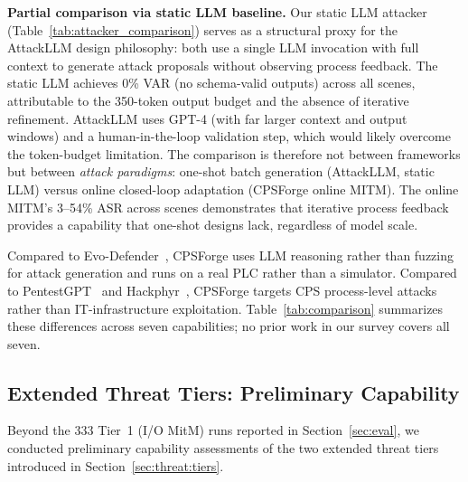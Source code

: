 \textbf{Partial comparison via static LLM baseline.} Our static LLM attacker (Table~\ref{tab:attacker_comparison}) serves as a structural proxy for the AttackLLM design philosophy: both use a single LLM invocation with full context to generate attack proposals without observing process feedback. The static LLM achieves 0\% VAR (no schema-valid outputs) across all scenes, attributable to the 350-token output budget and the absence of iterative refinement. AttackLLM uses GPT-4 (with far larger context and output windows) and a human-in-the-loop validation step, which would likely overcome the token-budget limitation. The comparison is therefore not between frameworks but between \emph{attack paradigms}: one-shot batch generation (AttackLLM, static LLM) versus online closed-loop adaptation (CPSForge online MITM). The online MITM's 3--54\% ASR across scenes demonstrates that iterative process feedback provides a capability that one-shot designs lack, regardless of model scale.

Compared to Evo-Defender~\cite{hu2025evodefender}, CPSForge uses LLM reasoning rather than fuzzing for attack generation and runs on a real PLC rather than a simulator. Compared to PentestGPT~\cite{deng2024pentestgpt} and Hackphyr~\cite{rigaki2024hackphyr}, CPSForge targets CPS process-level attacks rather than IT-infrastructure exploitation. Table~\ref{tab:comparison} summarizes these differences across seven capabilities; no prior work in our survey covers all seven.

\subsection{Extended Threat Tiers: Preliminary Capability}
\label{sec:discussion:tiers}

Beyond the 333 Tier~1 (I/O MitM) runs reported in Section~\ref{sec:eval}, we conducted preliminary capability assessments of the two extended threat tiers introduced in Section~\ref{sec:threat:tiers}.


